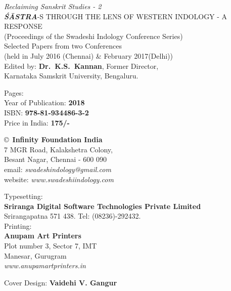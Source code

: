 \thispagestyle{empty}
\noindent
{\fontsize{9}{11}\selectfont\sl Reclaiming Sanskrit Studies - 2}\\
{\sl\bfseries ŚĀSTRA}-S THROUGH THE LENS OF WESTERN INDOLOGY - A RESPONSE\\ 
(Proceedings of the Swadeshi Indology Conference Series)\\
Selected Papers from two Conferences\\ 
(held in July 2016 (Chennai) \& February 2017(Delhi))\\
Edited by: {\bf Dr.\ K.S.\ Kannan}, Former Director,\\ 
Karnataka Samskrit University, Bengaluru.
\vfill

\noindent
Pages: {\bf\pageref{bookend}}\\
Year of Publication: {\bf 2018}\\
ISBN: {\bf 978-81-934486-3-2}\\
Price in India: {\bf 175/-}
\vfill

\noindent
\copyright\ {\bf Infinity Foundation India}\\ 
7 MGR Road, Kalakshetra Colony,\\ 
Besant Nagar, Chennai - 600 090\\
email: {\sl swadeshindology@gmail.com}\\
website: {\sl www.swadeshiindology.com} 
\vfill

\noindent
Typesetting:\\ 
{\bf Sriranga Digital Software Technologies Private Limited}\\ 
Srirangapatna 571 438. Tel: (08236)-292432.\\

\noindent
Printing:\\
{\bf Anupam Art Printers}\\
Plot number 3, Sector 7, IMT\\
Manesar, Gurugram\\
{\sl www.anupamartprinters.in}
\noindent

\bigskip

Cover Design: {\bf Vaidehi V. Gangur}

